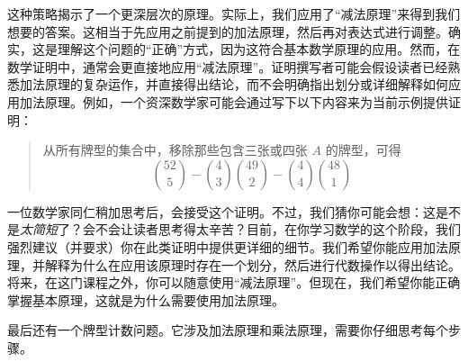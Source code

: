 \begin{example}[最多两张 $A$]
    这种策略揭示了一个更深层次的原理。实际上，我们应用了``减法原理''来得到我们想要的答案。这相当于先应用之前提到的加法原理，然后再对表达式进行调整。确实，这是理解这个问题的``正确''方式，因为这符合基本数学原理的应用。然而，在数学证明中，通常会更直接地应用``减法原理''。证明撰写者可能会假设读者已经熟悉加法原理的复杂运作，并直接得出结论，而不会明确指出划分或详细解释如何应用加法原理。例如，一个资深数学家可能会通过写下以下内容来为当前示例提供证明：
    \begin{quotation}
        从所有牌型的集合中，移除那些包含三张或四张 $A$ 的牌型，可得
        \[{52 \choose 5}-{4 \choose 3}{49 \choose 2}-{4 \choose 4}{48 \choose 1}\]
    \end{quotation}
    一位数学家同仁稍加思考后，会接受这个证明。不过，我们猜你可能会想：这是不是\emph{太简短}了？会不会让读者思考得太辛苦？目前，在你学习数学的这个阶段，我们强烈建议（并要求）你在此类证明中提供更详细的细节。我们希望你能应用加法原理，并解释为什么在应用该原理时存在一个划分，然后进行代数操作以得出结论。将来，在这门课程之外，你可以随意使用``减法原理''。但现在，我们希望你能正确掌握基本原理，这就是为什么需要使用加法原理。

    最后还有一个牌型计数问题。它涉及加法原理和乘法原理，需要你仔细思考每个步骤。
\end{example}

